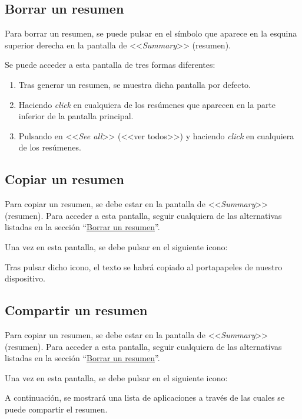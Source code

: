 \subsection{Borrar un resumen} \label{subsection:borrar}

Para borrar un resumen, se puede pulsar en el símbolo que aparece en la esquina superior derecha en la pantalla de <<\emph{Summary}>> (resumen).

Se puede acceder a esta pantalla de tres formas diferentes:

\begin{enumerate}
	\item Tras generar un resumen, se muestra dicha pantalla por defecto.
	
	\item Haciendo \emph{click} en cualquiera de los resúmenes que aparecen en la parte inferior de la pantalla principal.
	
	\item Pulsando en <<\emph{See all}>> (<<ver todos>>) y haciendo \emph{click} en cualquiera de los resúmenes.
\end{enumerate}


\subsection{Copiar un resumen}

Para copiar un resumen, se debe estar en la pantalla de <<\emph{Summary}>> (resumen). Para acceder a esta pantalla, seguir cualquiera de las alternativas listadas en la sección ``\hyperref[subsection:borrar]{Borrar un resumen}''.

Una vez en esta pantalla, se debe pulsar en el siguiente icono:

Tras pulsar dicho icono, el texto se habrá copiado al portapapeles de nuestro dispositivo.


\subsection{Compartir un resumen}

Para copiar un resumen, se debe estar en la pantalla de <<\emph{Summary}>> (resumen). Para acceder a esta pantalla, seguir cualquiera de las alternativas listadas en la sección ``\hyperref[subsection:borrar]{Borrar un resumen}''.

Una vez en esta pantalla, se debe pulsar en el siguiente icono:

A continuación, se mostrará una lista de aplicaciones a través de las cuales se puede compartir el resumen.



